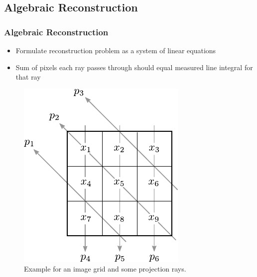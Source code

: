 \subsection{Algebraic Reconstruction}
\label{sub:ct_algebraic}

\begin{frame}
	\frametitle{Algebraic Reconstruction}

	\begin{itemize}
		\item Formulate reconstruction problem as a system of linear equations
		\item Sum of pixels each ray passes through should
		      equal measured line integral for that ray
	\end{itemize}

	\begin{figure}[tbp]
		\centering
		\includegraphics[height=0.65\textheight]{images/algebraic_1}
		\caption{Example for an image grid and some projection rays.}
		\label{fig:ct_algebraic_1}
	\end{figure}

\end{frame}

